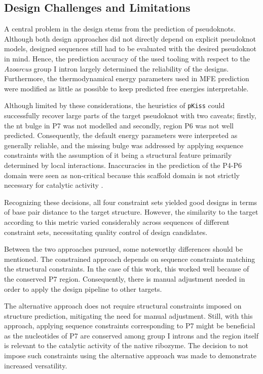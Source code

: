 \documentclass[../../master.tex]{subfiles}
\begin{document}
\subsection{Design Challenges and Limitations}
\label{sub:discussion:challenges_limitations}

A central problem in the design stems from the prediction of pseudoknots.
Although both design approaches did not directly depend on explicit pseudoknot models, designed sequences still had to be evaluated with the desired pseudoknot in mind.
Hence, the prediction accuracy of the used tooling with respect to the \textit{Azoarcus} group I intron largely determined the reliability of the designs.
Furthermore, the thermodynamical energy parameters used in MFE prediction were modified as little as possible to keep predicted free energies interpretable.

Although limited by these considerations, the heuristics of \texttt{pKiss} could successfully recover large parts of the target pseudoknot with two caveats; firstly, the \unit[1]{nt} bulge in P7 was not modelled and secondly, region P6 was not well predicted.
Consequently, the default energy parameters were interpreted as generally reliable, and the missing bulge was addressed by applying sequence constraints with the assumption of it being a structural feature primarily determined by local interactions.
Inaccuracies in the prediction of the P4-P6 domain were seen as non-critical because this scaffold domain is not strictly necessary for catalytic activity \parencite{hayden_intramolecular_2015}.

Recognizing these decisions, all four constraint sets yielded good designs in terms of base pair distance to the target structure.
However, the similarity to the target according to this metric varied considerably across sequences of different constraint sets, necessitating quality control of design candidates.

Between the two approaches pursued, some noteworthy differences should be mentioned.
The constrained approach depends on sequence constraints matching the structural constraints.
In the case of this work, this worked well because of the conserved P7 region.
Consequently, there is manual adjustment needed in order to apply the design pipeline to other targets.

The alternative approach does not require structural constraints imposed on structure prediction, mitigating the need for manual adjustment.
Still, with this approach, applying sequence constraints corresponding to P7 might be beneficial as the nucleotides of P7 are conserved among group I introns and the region itself is relevant to the catalytic activity of the native ribozyme. 
The decision to not impose such constraints using the alternative approach was made to demonstrate increased versatility.
\end{document}
